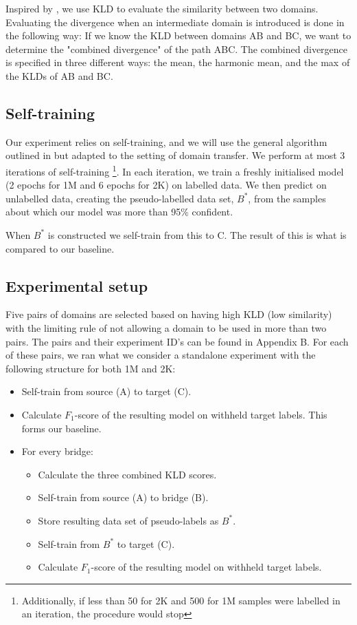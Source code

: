 \documentclass[11pt,a4paper]{article}
\begin{document}
Inspired by \cite{van-asch-daelemans-2010-using}, we use KLD to evaluate the similarity between two domains.
Evaluating the divergence when an intermediate domain is introduced is done in the following way: 
If we know the KLD between domains A\textrightarrow B and B\textrightarrow C, we want to determine the "combined divergence" of the path A\textrightarrow B\textrightarrow C.
The combined divergence is specified in three different ways: the mean, the harmonic mean, and the max of the KLDs of A\textrightarrow B and B\textrightarrow C.

\subsection*{Self-training}
Our experiment relies on self-training, and we will use the general algorithm outlined in \cite{yarowsky1995unsupervised} but adapted to the setting of domain transfer.
We perform at most 3 iterations of self-training \footnote{Additionally, if less than 50 for 2K and 500 for 1M samples were labelled in an iteration, the procedure would stop}.
In each iteration, we train a freshly initialised model (2 epochs for 1M and 6 epochs for 2K) on labelled data.
We then predict on unlabelled data, creating the pseudo-labelled data set, $B^*$, from the samples about which our model was more than 95\% confident.

When $B^*$ is constructed we self-train from this to C. The result of this is what is compared to our baseline.

\subsection*{Experimental setup}
Five pairs of domains are selected based on having high KLD (low similarity) with the limiting rule of not allowing a domain to be used in more than two pairs.
The pairs and their experiment ID's can be found in Appendix B. For each of these pairs, we ran what we consider a standalone experiment with the following structure for both 1M and 2K:
\begin{itemize}
        \item Self-train from source (A) to target (C).
        \item Calculate $F_1$-score of the resulting model on withheld target labels. This forms our baseline.
        \item For every bridge:
     \subitem \begin{itemize}
     \vspace{-2em}
        \item Calculate the three combined KLD scores.
        \item Self-train from source (A) to bridge (B).
        \item Store resulting data set of pseudo-labels as $B^*$.
        \item Self-train from $B^*$ to target (C).
        \item Calculate $F_1$-score of the resulting model on withheld target labels.
    \end{itemize}
\end{itemize}
\end{document}
